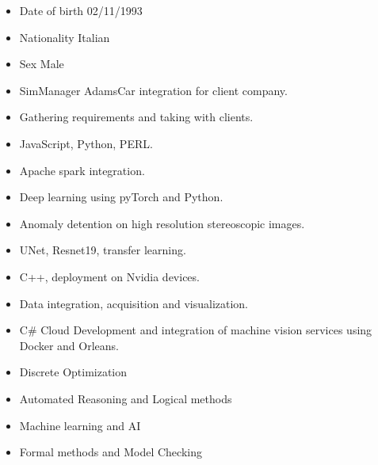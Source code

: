 \documentclass[10pt,a4paper,ragged2e,withhyper]{altacv}
\begin{document}
\begin{paracol}{2}

\begin{itemize}
\item Date of birth 02/11/1993
\item Nationality Italian
\item Sex Male
\end{itemize}


\begin{itemize}
\item SimManager AdamsCar integration for client company.
\item Gathering requirements and taking with clients.
\item JavaScript, Python, PERL.
\item Apache spark integration.
\end{itemize}

\divider

\begin{itemize}
\item Deep learning using pyTorch and Python.
\item Anomaly detention on high resolution stereoscopic images.
\item UNet, Resnet19, transfer learning.
\item C++, deployment on Nvidia devices.
\item Data integration, acquisition and visualization.
\item C\# Cloud Development and integration of machine vision services using Docker and Orleans. 
\end{itemize}


\begin{itemize}
\item Discrete Optimization
\item Automated Reasoning and Logical methods
\item Machine learning and AI
\item Formal methods and Model Checking
\end{itemize}


\end{paracol}
\end{document}
